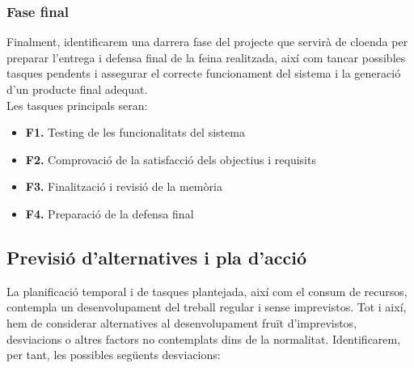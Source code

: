 \subsubsection{Fase final}
Finalment, identificarem una darrera fase del projecte que servirà de cloenda per preparar l’entrega i defensa final de la feina realitzada, així com tancar possibles tasques pendents i assegurar el correcte funcionament del sistema i la generació d’un producte final adequat. \\

Les tasques principals seran:

\begin{itemize}
\item \textbf{F1.} Testing de les funcionalitats del sistema
\item \textbf{F2.} Comprovació de la satisfacció dels objectius i requisits
\item \textbf{F3.} Finalització i revisió de la memòria
\item \textbf{F4.} Preparació de la defensa final
\end{itemize}

\subsection{Previsió d'alternatives i pla d'acció}

La planificació temporal i de tasques plantejada, així com el consum de recursos, contempla un desenvolupament del treball regular i sense imprevistos. Tot i així, hem de considerar alternatives al desenvolupament fruït d’imprevistos, desviacions o altres factors no contemplats dins de la normalitat. Identificarem, per tant, les possibles següents desviacions:

